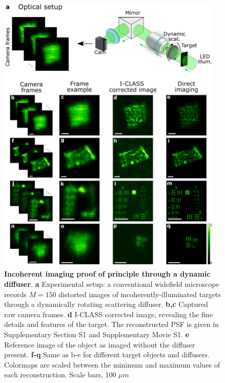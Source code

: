 \documentclass[pdflatex,sn-mathphys-num]{sn-jnl}%
\theoremstyle{thmstyleone}%
\theoremstyle{thmstyletwo}%
\theoremstyle{thmstylethree}%
\begin{document}
\begin{figure}[htb!]
	\centering
	\includegraphics [width=0.96\textwidth,]
	{figures/figure_2.pdf}
    \caption{\textbf{Incoherent imaging proof of principle through a dynamic diffuser}.
   \textbf{a} Experimental setup: a conventional widefield microscope records $M=150$ distorted images of incoherently-illuminated targets through a dynamically rotating scattering diffuser. 
    \textbf{b,c} Captured raw camera frames.
    \textbf{d} I-CLASS corrected image, revealing the fine details and features of the target. The reconstructed PSF is given in Supplementary Section S1 and Supplementary Movie S1.
    \textbf{e} Reference image of the object as imaged without the diffuser present.
    \textbf{f-q} Same as b-e for different target objects and diffusers.
    Colormaps are scaled between the minimum and maximum values of each reconstruction. Scale bars, 100 $\mu m$}
    \label{fig2}
\end{figure} 
\end{document}
